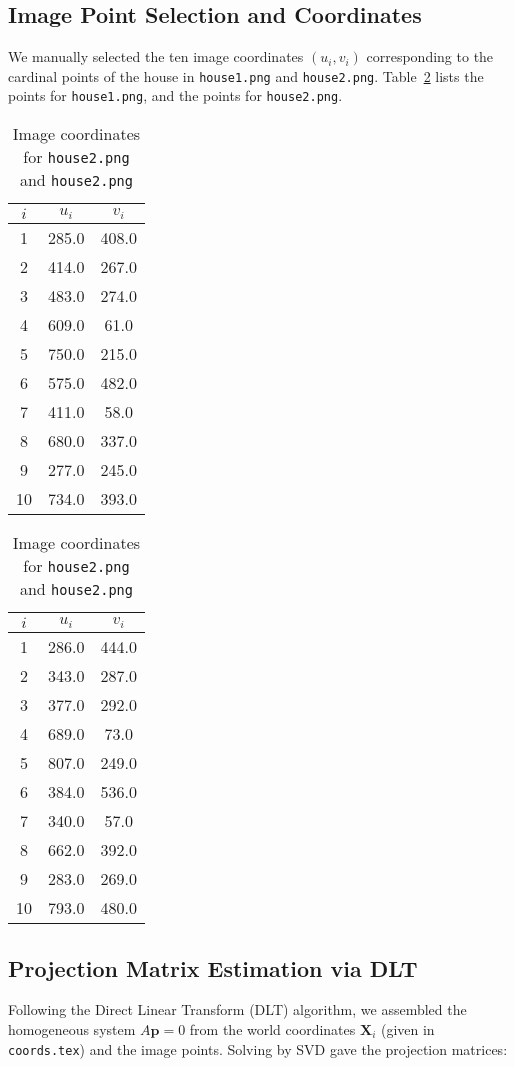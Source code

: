 \subsection{Image Point Selection and Coordinates}
We manually selected the ten image coordinates $(u_i,v_i)$ corresponding to the cardinal points of the house in \texttt{house1.png} and \texttt{house2.png}. Table~\ref{tab:imgpts2} lists the points for \texttt{house1.png}, and the points for \texttt{house2.png}.

\begin{table}[H]
  \centering
  \begin{tabular}{c|cc}
    $i$ & $u_i$ & $v_i$ \\
    \hline
    1 & 285.0 & 408.0 \\
    2 & 414.0 & 267.0 \\
    3 & 483.0 & 274.0 \\
    4 & 609.0 & 61.0  \\
    5 & 750.0 & 215.0 \\
    6 & 575.0 & 482.0 \\
    7 & 411.0 & 58.0  \\
    8 & 680.0 & 337.0 \\
    9 & 277.0 & 245.0 \\
    10 & 734.0 & 393.0\\
\end{tabular}
\hspace{2cm}
\begin{tabular}{c|cc}
    $i$ & $u_i$ & $v_i$ \\
    \hline
    1 & 286.0 & 444.0 \\
    2 & 343.0 & 287.0 \\
    3 & 377.0 & 292.0 \\
    4 & 689.0 & 73.0  \\
    5 & 807.0 & 249.0 \\
    6 & 384.0 & 536.0 \\
    7 & 340.0 & 57.0  \\
    8 & 662.0 & 392.0 \\
    9 & 283.0 & 269.0 \\
    10 & 793.0 & 480.0\\
\end{tabular}
\caption{Image coordinates for \texttt{house2.png} and \texttt{house2.png}}
\label{tab:imgpts2}
\end{table}

\subsection{Projection Matrix Estimation via DLT}
Following the Direct Linear Transform (DLT) algorithm, we assembled the homogeneous system $A\mathbf{p}=0$ from the world coordinates $\mathbf{X}_i$ (given in \texttt{coords.tex}) and the image points. Solving by SVD gave the projection matrices:

